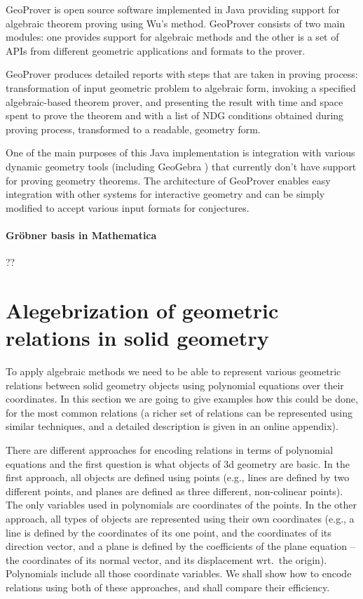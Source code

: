 \documentclass[final,1p,times,authoryear]{elsarticle}
\begin{document}
GeoProver is open source software implemented in Java providing
support for algebraic theorem proving using Wu's method. GeoProver
consists of two main modules: one provides support for algebraic
methods and the other is a set of APIs from different geometric
applications and formats to the prover.  

GeoProver produces detailed reports with steps that are taken in
proving process: transformation of input geometric problem to
algebraic form, invoking a specified algebraic-based theorem prover,
and presenting the result with time and space spent to prove the
theorem and with a list of NDG conditions obtained during proving
process, transformed to a readable, geometry form.

One of the main purposes of this Java implementation is integration
with various dynamic geometry tools (including GeoGebra ) that
currently don’t have support for proving geometry theorems. The
architecture of GeoProver enables easy integration with other systems
for interactive geometry and can be simply modified to accept various
input formats for conjectures.

\paragraph{Gr\"obner basis in Mathematica}

??

\section{Alegebrization of geometric relations in solid geometry}
\label{polynomials}
To apply algebraic methods we need to be able to represent various
geometric relations between solid geometry objects using polynomial
equations over their coordinates. In this section we are going to give
examples how this could be done, for the most common relations (a
richer set of relations can be represented using similar techniques,
and a detailed description is given in an online
appendix). %

There are different approaches for encoding relations in terms of
polynomial equations and the first question is what objects of 3d
geometry are basic. %
In the first approach, all objects are defined using points (e.g.,
lines are defined by two different points, and planes are defined as
three different, non-colinear points). The only variables used in
polynomials are coordinates of the points. In the other approach, all
types of objects are represented using their own coordinates (e.g., a
line is defined by the coordinates of its one point, and the
coordinates of its direction vector, and a plane is defined by the
coefficients of the plane equation -- the coordinates of its normal
vector, and its displacement wrt.~the origin). Polynomials include all
those coordinate variables. We shall show how to encode relations
using both of these approaches, and shall compare their efficiency.
\end{document}
